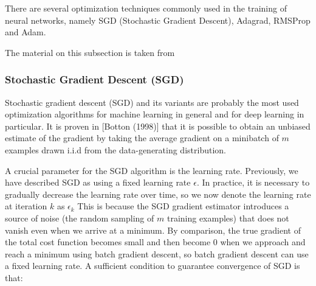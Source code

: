     There are several optimization techniques commonly used in the training of neural networks, namely SGD (Stochastic Gradient Descent), Adagrad, RMSProp and Adam.
    
    The material on this subsection is taken from \cite{Goodfellow-et-al-2016}
    \subsubsection{Stochastic Gradient Descent (SGD)}
    Stochastic gradient descent (SGD) and its variants are probably the most used optimization algorithms for machine learning in general and for deep learning in particular. It is proven in  [Botton (1998)] that it is possible to obtain an unbiased estimate of the gradient by taking the average gradient on a minibatch of $m$ examples drawn i.i.d from the data-generating distribution.
    
        A crucial parameter for the SGD algorithm is the learning rate. Previously, we
    have described SGD as using a fixed learning rate $\epsilon$. In practice, it is necessary to
    gradually decrease the learning rate over time, so we now denote the learning rate
    at iteration $k$ as $\epsilon_k$ 
    This is because the SGD gradient estimator introduces a source of noise (the random sampling of
    $m$ training examples) that does not vanish even when we arrive at a minimum. By comparison, the true gradient of the total cost function becomes small and then
    become $0$ when we approach and reach a minimum using batch gradient descent, so batch gradient descent can use a fixed learning rate. A sufficient condition to guarantee convergence of SGD is that:
    

